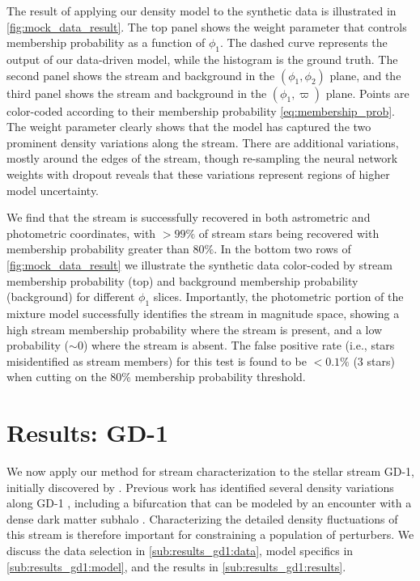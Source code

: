 \documentclass[twocolumn]{aastex631}
\newcommand{\stream}[1]{#1}
\newcommand{\parallax}{\varpi}
\begin{document}
        The result of applying our density model to the synthetic data is
        illustrated in \autoref{fig:mock_data_result}. The top panel shows the
        weight parameter that controls membership probability as a function of
        $\phi_1$. The dashed curve represents the output of our data-driven
        model, while the histogram is the ground truth. The second panel shows
        the stream and background in the $(\phi_1,\phi_2)$ plane, and the third
        panel shows the stream and background in the $(\phi_1,\parallax)$ plane.
        Points are color-coded according to their membership probability
        \autoref{eq:membership_prob}. The weight parameter clearly shows that
        the model has captured the two prominent density variations along the
        stream.  There are additional variations, mostly around the edges of the
        stream, though re-sampling the neural network weights with dropout
        reveals that these variations represent regions of higher model
        uncertainty. 

        We find that the stream is successfully recovered in both astrometric
        and photometric coordinates, with
        $>99\%$ %
        of stream stars being recovered with membership probability greater than
        $80\%$.  In the bottom two rows of \autoref{fig:mock_data_result} we
        illustrate the synthetic data color-coded by stream membership
        probability (top) and background membership probability (background) for
        different $\phi_1$ slices. Importantly, the photometric portion of the
        mixture model successfully identifies the stream in magnitude space,
        showing a high stream membership probability where the stream is
        present, and a low probability ($\sim 0$) where the stream is absent.
        The false positive rate (i.e., stars misidentified as stream members)
        for this test is found to be $<0.1\%$ (3 stars) when cutting on the 80\%
        membership probability threshold.


\section{Results: GD-1} \label{sec:results_gd1}

    We now apply our method for stream characterization to the stellar stream
    \stream{GD-1}, initially discovered by \citet{GrillmairDionatos2006}.
    Previous work has identified several density variations along \stream{GD-1}
    \citep{deBoer+2018}, including a bifurcation that can be modeled by an
    encounter with a dense dark matter subhalo \citep{Bonaca+2019, Webb+2019}.
    Characterizing the detailed density fluctuations of this stream is therefore
    important for constraining a population of perturbers.  We discuss the data
    selection in \autoref{sub:results_gd1:data}, model specifics in
    \autoref{sub:results_gd1:model}, and the results in
    \autoref{sub:results_gd1:results}.
\end{document}
